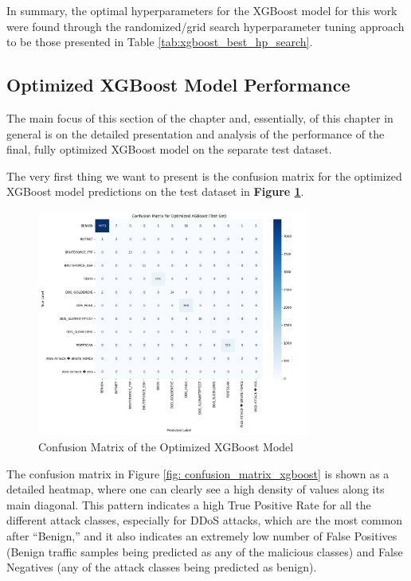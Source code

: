In summary, the optimal hyperparameters for the XGBoost model for this work were found through the randomized/grid search hyperparameter tuning approach to be those presented in Table \ref{tab:xgboost_best_hp_search}.

\subsection{Optimized XGBoost Model Performance} 

The main focus of this section of the chapter and, essentially, of this chapter in general is on the detailed presentation and analysis of the performance of the final, fully optimized XGBoost model on the separate test dataset.

The very first thing we want to present is the confusion matrix for the optimized XGBoost model predictions on the test dataset in \textbf{Figure \ref{fig:confusion_matrix_xgboost}}.

\begin{figure}[H]
\centering
\includegraphics[width=0.8\textwidth]{assets/figures/results/confusion_matrix_xgboost.png}
\caption{Confusion Matrix of the Optimized XGBoost Model}
\label{fig:confusion_matrix_xgboost}
\end{figure}


The confusion matrix in Figure \ref{fig: confusion_matrix_xgboost} is shown as a detailed heatmap, where one can clearly see a high density of values along its main diagonal. This pattern indicates a high True Positive Rate for all the different attack classes, especially for DDoS attacks, which are the most common after “Benign,” and it also indicates an extremely low number of False Positives (Benign traffic samples being predicted as any of the malicious classes) and False Negatives (any of the attack classes being predicted as benign).

